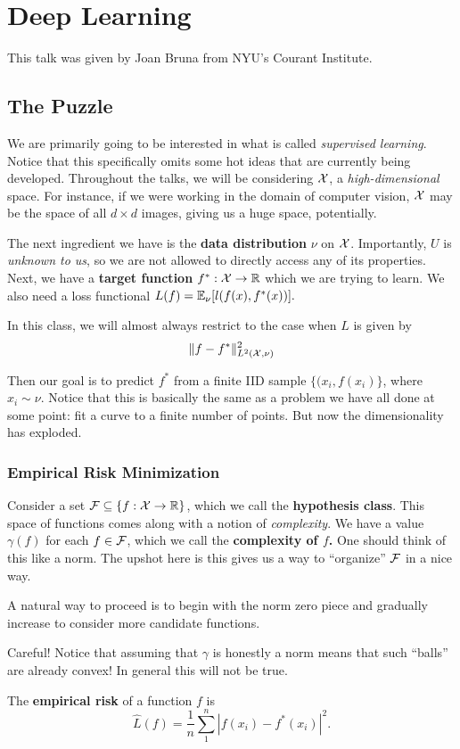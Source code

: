 \documentclass[12pt]{article}
\begin{document}
\section{Deep Learning}
This talk was given by Joan Bruna from NYU's Courant Institute.
\subsection{The Puzzle}
We are primarily going to be interested in what is called \textit{supervised learning}. Notice that this specifically omits some hot ideas that are currently being developed.
Throughout the talks, we will be considering $\mathcal{X}$, a \textit{high-dimensional} space. For instance, if we were working in the domain of computer vision, $\mathcal{X}$ may be the space of all $d\times d$ images,
giving us a huge space, potentially.

The next ingredient we have is the \textbf{data distribution} $\nu$ on $\mathcal{X}$. Importantly, $U$ is \textit{unknown to us}, so we are not allowed to directly access any of its properties. Next, we have a \textbf{target function}
$f^\ast:\mathcal{X}\to \mathbb{R}$ which we are trying to learn. We also need a loss functional $L(f)=\mathbb{E}_\nu[l(f(x),f^\ast(x))].$
\begin{rmk}
	In this class, we will almost always restrict to the case when $L$ is given by 
	\[\|f-f^\ast\|^2_{L^2(\mathcal{X},\nu)}\]
\end{rmk}

Then our goal is to predict $f^\ast$ from a finite IID sample $\{(x_i,f(x_i)\}$, where $x_i\sim \nu$.
Notice that this is basically the same as a problem we have all done at some point: fit a curve to a finite number of points. But now the dimensionality has exploded.
\subsubsection{Empirical Risk Minimization}
Consider a set $\mathcal{F}\subseteq\{f:\mathcal{X}\to\mathbb{R}\}$, which we call the \textbf{hypothesis class}. This space of functions comes along with a notion of \textit{complexity}.
We have a value $\gamma(f)$ for each $f\in\mathcal{F}$, which we call the \textbf{complexity of $f$.} One should think of this like a norm. The upshot here is this gives us a way to ``organize'' $\mathcal{F}$ in a nice way.

A natural way to proceed is to begin with the norm zero piece and gradually increase to consider more candidate functions.
\begin{rmk}
	Careful! Notice that assuming that $\gamma$ is honestly a norm means that such ``balls'' are already convex! In general this will not be true.
\end{rmk}
\begin{defn}
	The \textbf{empirical risk} of a function $f$ is 
	\[\hat L(f)=\frac{1}{n}\sum_1^n|f(x_i)-f^\ast(x_i)|^2.\]
\end{defn}
\end{document}
